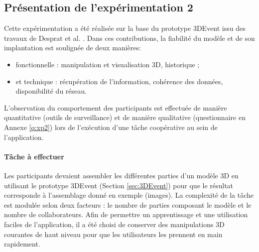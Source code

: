 

\subsection{Présentation de l'expérimentation 2}
 Cette expérimentation a été réalisée sur la base du prototype 3DEvent issu des 
 travaux de Desprat et al.  
\cite{Desprat2016,Desprat2017}. Dans ces contributions, la fiabilité 
du modèle et de son implantation est soulignée de deux manières: 
\begin{itemize}
	\item fonctionnelle : manipulation et visualisation 
	3D, historique ;
	\item et technique : récupération de l'information, cohérence des 
	données, disponibilité du réseau.
\end{itemize}

L'observation du comportement des participants est 
effectuée de manière quantitative (outils de surveillance) et de manière qualitative 
(questionnaire en Annexe \ref{q:xp2}) lors de l'exécution d'une tâche 
coopérative au sein de l'application.


\paragraph{Tâche à effectuer}
Les participants devaient assembler les différentes parties d'un modèle \gls{3D} en 
utilisant le prototype 3DEvent (Section \ref{sec:3DEvent}) pour que le résultat 
corresponde à l'assemblage donné en exemple (images). 
La complexité de la tâche est modulée selon deux facteurs : le nombre de parties 
composant le modèle et le nombre de collaborateurs. 
Afin de permettre un apprentissage et une utilisation faciles de l'application, il a 
été choisi de conserver des manipulations 3D courantes de haut niveau pour que 
les utilisateurs les prennent en main rapidement.
